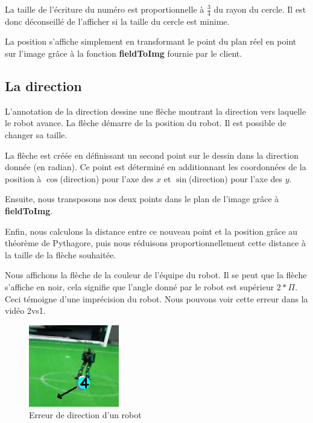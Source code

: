 La taille de l'écriture du numéro est proportionnelle à 
$\frac{3}{4}$ du rayon du cercle. Il est donc déconseillé de 
l'afficher si la taille du cercle est minime.

La position s'affiche simplement en transformant le point du plan
réel en point sur l'image grâce à la fonction \textbf{fieldToImg}
fournie par le client.

\subsection{La direction}

L'annotation de la direction dessine une flèche montrant la 
direction vers laquelle le robot avance. La flèche démarre de la 
position du robot. Il est possible de changer sa taille.

\bigskip

La flèche est créée en définissant un second point sur le dessin 
dans la direction donnée (en radian). Ce point est déterminé en 
additionnant les coordonnées de la position à $\cos$(direction) 
pour l'axe des $x$ et $\sin$(direction) pour l'axe des  $y$.

Ensuite, nous transposons nos deux points dans le plan de l'image
grâce à \textbf{fieldToImg}.

Enfin, nous calculons la distance entre ce nouveau point et la
position grâce au théorème de Pythagore, puis nous réduisons
proportionnellement cette distance à la taille de la flèche
souhaitée.
\bigskip

Nous affichons la flèche de la couleur de l'équipe du robot. Il 
se peut que la flèche s'affiche en noir, cela signifie que 
l'angle donné par le robot est supérieur $2*\Pi$. Ceci témoigne 
d'une imprécision du robot. 
Nous pouvons voir cette erreur dans la vidéo 2vs1.


\begin{figure}[h] 
\centering 
\includegraphics[scale = 0.5]{images/wrongdir.png}
    \caption{Erreur de direction d'un robot}
    \label{fig:dir}
\end{figure}

\newpage

